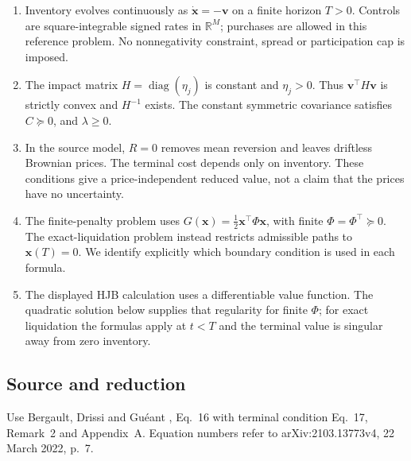 \documentclass[11pt,a4paper]{article}
\begin{document}
\begin{enumerate}
\item Inventory evolves continuously as $\dot{\mathbf x}=-\mathbf v$ on
a finite horizon $T>0$. Controls are square-integrable signed rates in
$\mathbb R^M$; purchases are allowed in this reference problem.
No nonnegativity constraint, spread or participation cap is imposed.
\item The impact matrix $H=\operatorname{diag}(\eta_j)$ is constant and
$\eta_j>0$. Thus $\mathbf v^\top H\mathbf v$ is strictly convex and
$H^{-1}$ exists. The constant symmetric covariance satisfies $C\succeq0$,
and $\lambda\ge0$.
\item In the source model, $R=0$ removes mean reversion and leaves
driftless Brownian prices. The terminal cost depends only on inventory.
These conditions give a price-independent reduced value, not a claim
that the prices have no uncertainty.
\item The finite-penalty problem uses
$G(\mathbf x)=\tfrac12\mathbf x^\top\Phi\mathbf x$, with finite
$\Phi=\Phi^\top\succeq0$. The exact-liquidation problem instead restricts
admissible paths to $\mathbf x(T)=0$. We identify explicitly which
boundary condition is used in each formula.
\item The displayed HJB calculation uses a differentiable value function.
The quadratic solution below supplies that regularity for finite $\Phi$;
for exact liquidation the formulas apply at $t<T$ and the terminal
value is singular away from zero inventory.
\end{enumerate}

\subsection*{Source and reduction}

Use Bergault, Drissi and Gu\'eant \cite{bergault2022}, Eq.~16 with terminal
condition Eq.~17, Remark~2 and Appendix~A. Equation numbers refer to
arXiv:2103.13773v4, 22 March 2022, p.~7.
\end{document}
